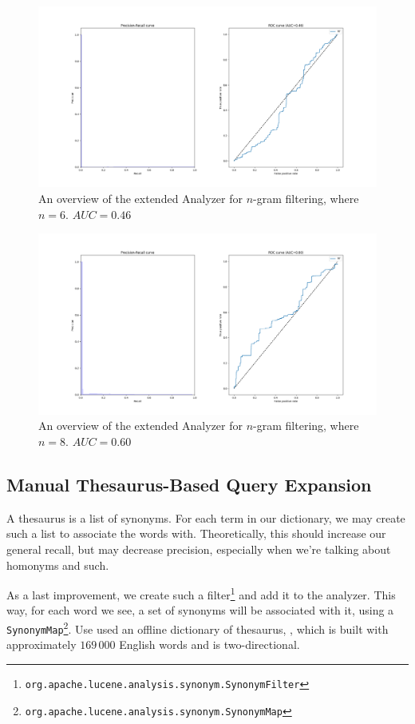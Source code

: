 \documentclass[11pt]{article}
\begin{document}
\begin{figure}[htp]
	\centering
	\includegraphics[width=\textwidth]{images/customAna-n6}
	\caption{An overview of the extended Analyzer for $n$-gram filtering, where $n = 6$. $AUC = 0.46$}
	\label{fig:ngram6}
\end{figure}
\begin{figure}[htp]
\centering
\includegraphics[width=\textwidth]{images/customAna-n8}
\caption{An overview of the extended Analyzer for $n$-gram filtering, where $n = 8$. $AUC = 0.60$}
\label{fig:ngram8}
\end{figure}

\subsection{Manual Thesaurus-Based Query Expansion}\label{sec:synonyms}
A thesaurus is a list of synonyms. For each term in our dictionary, we may create such a list to associate the words with. Theoretically, this should increase our general recall, but may decrease precision, especially when we're talking about homonyms and such.

As a last improvement, we create such a filter\footnote{\texttt{org.apache.lucene.analysis.synonym.SynonymFilter}} and add it to the analyzer. This way, for each word we see, a set of synonyms will be associated with it, using a \texttt{SynonymMap}\footnote{\texttt{org.apache.lucene.analysis.synonym.SynonymMap}}. Use used an offline dictionary of thesaurus, \cite{synonyms}, which is built with approximately $169\,000$ English words and is two-directional.
\end{document}
